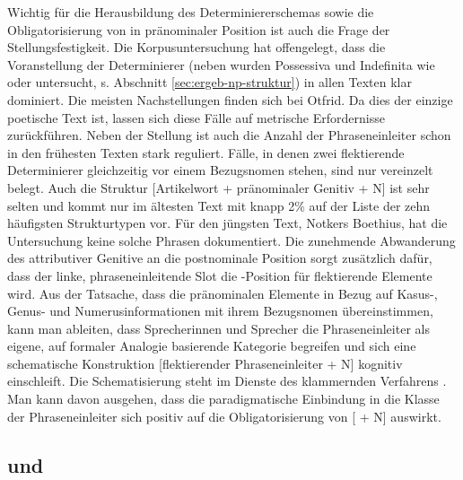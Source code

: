 Wichtig für die Herausbildung des Determiniererschemas sowie die Obligatorisierung von  in pränominaler Position ist auch die Frage der Stellungsfestigkeit. Die Korpusuntersuchung hat offengelegt, dass die Voranstellung der Determinierer (neben  wurden Possessiva und Indefinita wie  oder  untersucht, s. Abschnitt \ref{sec:ergeb-np-struktur}) in allen Texten klar dominiert. Die meisten Nachstellungen finden sich bei Otfrid. Da dies der einzige poetische Text ist, lassen sich diese Fälle auf metrische Erfordernisse zurückführen. Neben der Stellung ist auch die Anzahl der Phraseneinleiter schon in den frühesten Texten stark reguliert. Fälle, in denen zwei flektierende Determinierer gleichzeitig vor einem Bezugsnomen stehen, sind nur vereinzelt belegt. Auch die Struktur [Artikelwort + pränominaler Genitiv + N] ist sehr selten und kommt nur im ältesten Text mit knapp 2\% auf der Liste der zehn häufigsten Strukturtypen vor. Für den jüngsten Text, Notkers Boethius, hat die Untersuchung keine solche Phrasen dokumentiert. Die zunehmende Abwanderung des attributiver Genitive an die postnominale Position sorgt zusätzlich dafür, dass der linke, phraseneinleitende Slot die -Position für flektierende Elemente wird. Aus der Tatsache, dass die pränominalen Elemente in Bezug auf Kasus-, Genus- und Numerusinformationen mit ihrem Bezugsnomen übereinstimmen, kann man ableiten, dass Sprecherinnen und Sprecher die Phraseneinleiter als eigene, auf formaler Analogie basierende Kategorie begreifen und sich eine schematische Konstruktion [flektierender Phraseneinleiter + N] kognitiv einschleift. Die Schematisierung steht im Dienste des klammernden Verfahrens \parencite{Ronneberger-Sibold1994,Ronneberger-Sibold2010a,Szczepaniak2010,Szczepaniak2011a,Flick2018}. Man kann davon ausgehen, dass die paradigmatische Einbindung in die Klasse der Phraseneinleiter sich positiv auf die Obligatorisierung von [ + N] auswirkt.     


\subsection{ und } \label{sec:disk-weg-block}

